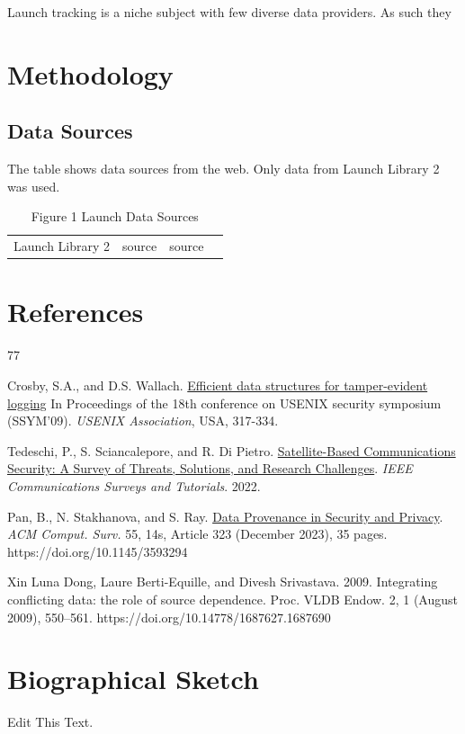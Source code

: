 \documentclass[12pt]{article}
\begin{document}
Launch tracking is a niche subject with few diverse data providers. As such they


\section{Methodology}

\subsection{Data Sources}

The table shows data sources from the web. Only data from Launch Library 2 was used.

\begin{table}
   \begin{tabular}{cccc}
         Launch Library 2 & source & source &
   \end{tabular}
   \caption{Figure 1 Launch Data Sources}
\end{table}

\section*{References}

\newpage

\begin{thebibliography}{77}   %

\small

 Crosby, S.A., and D.S. Wallach.  \underline{Efficient data structures for tamper-evident logging}  In Proceedings of the 18th conference on USENIX security symposium (SSYM'09). \textit{USENIX Association}, USA, 317-334.

 Tedeschi, P., S. Sciancalepore, and R. Di Pietro. \underline{Satellite-Based Communications Security: A Survey of Threats, Solutions, and Research Challenges}.  \textit{IEEE Communications Surveys and Tutorials}.  2022.

 Pan, B., N. Stakhanova, and S. Ray.  \underline{Data Provenance in Security and Privacy}.  \textit{ACM Comput. Surv.} 55, 14s, Article 323 (December 2023), 35 pages. https://doi.org/10.1145/3593294

 Xin Luna Dong, Laure Berti-Equille, and Divesh Srivastava. 2009. Integrating conflicting data: the role of source dependence. Proc. VLDB Endow. 2, 1 (August 2009), 550–561. https://doi.org/10.14778/1687627.1687690

\end{thebibliography}      %

\newpage
\section*{Biographical Sketch}

Edit This Text.
\end{document}

